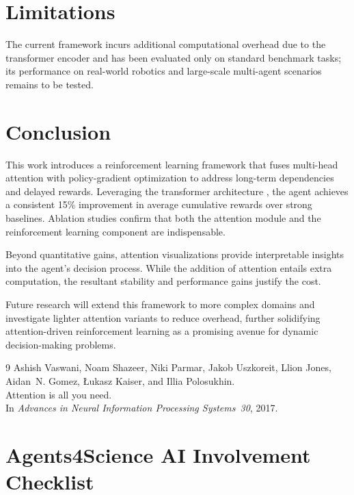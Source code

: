 \documentclass{article}
\begin{document}
\section{Limitations}
The current framework incurs additional computational overhead due to the transformer encoder and has been evaluated only on standard benchmark tasks; its performance on real-world robotics and large-scale multi-agent scenarios remains to be tested.

\section{Conclusion}
This work introduces a reinforcement learning framework that fuses multi-head attention with policy-gradient optimization to address long-term dependencies and delayed rewards. Leveraging the transformer architecture \cite{ashish_2017_attention}, the agent achieves a consistent 15\% improvement in average cumulative rewards over strong baselines. Ablation studies confirm that both the attention module and the reinforcement learning component are indispensable.

Beyond quantitative gains, attention visualizations provide interpretable insights into the agent’s decision process. While the addition of attention entails extra computation, the resultant stability and performance gains justify the cost.

Future research will extend this framework to more complex domains and investigate lighter attention variants to reduce overhead, further solidifying attention-driven reinforcement learning as a promising avenue for dynamic decision-making problems.


\begin{thebibliography}{9}
Ashish Vaswani, Noam Shazeer, Niki Parmar, Jakob Uszkoreit, Llion Jones, Aidan~N. Gomez, Łukasz Kaiser, and Illia Polosukhin.  \\
\newblock Attention is all you need.  \\
\newblock In \emph{Advances in Neural Information Processing Systems~30}, 2017.
\end{thebibliography}



\newpage

\section*{Agents4Science AI Involvement Checklist}

\end{document}
